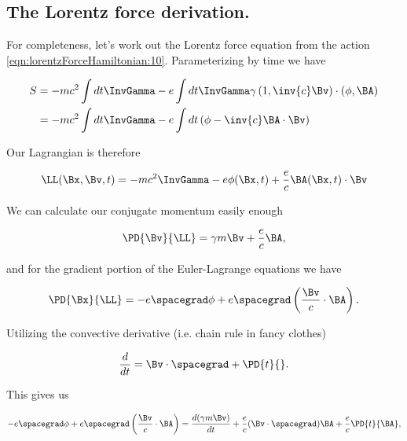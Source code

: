 \subsection{The Lorentz force derivation.}

For completeness, let's work out the Lorentz force equation from the action \ref{eqn:lorentzForceHamiltonian:10}.  Parameterizing by time we have

\begin{align*}
S 
&= -m c^2 \int dt \InvGamma - e \int dt \InvGamma \gamma \left( 1, \inv{c} \Bv\right) \cdot (\phi, \BA) \\
&= -m c^2 \int dt \InvGamma - e \int dt \left( \phi - \inv{c} \BA \cdot \Bv \right)
\end{align*}

Our Lagrangian is therefore

\begin{equation}\label{eqn:lorentzForceHamiltonian:n}
\LL(\Bx, \Bv, t) = 
-m c^2 \InvGamma - e \phi(\Bx, t) + \frac{e}{c} \BA(\Bx, t) \cdot \Bv
\end{equation}

We can calculate our conjugate momentum easily enough

\begin{equation}\label{eqn:lorentzForceHamiltonian:n}
\PD{\Bv}{\LL} = \gamma m \Bv + \frac{e}{c} \BA,
\end{equation}

and for the gradient portion of the Euler-Lagrange equations we have

\begin{equation}\label{eqn:lorentzForceHamiltonian:n}
\PD{\Bx}{\LL} = -e \spacegrad \phi + e \spacegrad \left( \frac{\Bv}{c} \cdot \BA \right).
\end{equation}

Utilizing the convective derivative (i.e. chain rule in fancy clothes) 

\begin{equation}\label{eqn:lorentzForceHamiltonian:n}
\frac{d}{dt} = \Bv \cdot \spacegrad + \PD{t}{}.
\end{equation}

This gives us

\begin{equation}\label{eqn:lorentzForceHamiltonian:n}
-e \spacegrad \phi + e \spacegrad \left( \frac{\Bv}{c} \cdot \BA \right) = 
\frac{d(\gamma m \Bv)}{dt} 
+ \frac{e}{c} (\Bv \cdot \spacegrad) \BA
+ \frac{e}{c} \PD{t}{\BA},
\end{equation}

